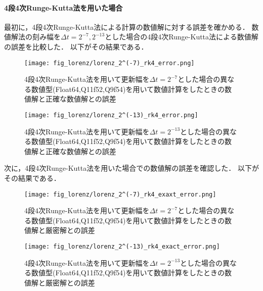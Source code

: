 \paragraph*{4段4次Runge-Kutta法を用いた場合}
最初に，4段4次Runge-Kutta法による計算の数値解に対する誤差を確かめる．
数値解法の刻み幅を$\Delta t = 2^{-7},2^{-13}$とした場合の4段4次Runge-Kutta法による数値解の誤差を比較した．
以下がその結果である．
\begin{figure}[H]
    \centering
    \begin{minipage}[b]{0.49\columnwidth}
        \centering
        \texttt{[image: fig\_lorenz/lorenz\_2^(-7)\_rk4\_error.png]}
        \caption{4段4次Runge-Kutta法を用いて更新幅を$\Delta t = 2^{-7}$とした場合の異なる数値型(Float64,Q11f52,Q9f54)を用いて数値計算をしたときの数値解と正確な数値解との誤差}
        \label{fig:lorenz_2^(-7)_rk4_error}
    \end{minipage}
    \begin{minipage}[b]{0.49\columnwidth}
        \centering
        \texttt{[image: fig\_lorenz/lorenz\_2^(-13)\_rk4\_error.png]}
        \caption{4段4次Runge-Kutta法を用いて更新幅を$\Delta t =  2^{-13}$とした場合の異なる数値型(Float64,Q11f52,Q9f54)を用いて数値計算をしたときの数値解と正確な数値解との誤差}
        \label{fig:lorenz_2^(-13)_rk4_error}
    \end{minipage}
\end{figure}
次に，4段4次Runge-Kutta法を用いた場合での数値解の誤差を確認した．
以下がその結果である．
\begin{figure}[H]
    \centering
    \begin{minipage}[b]{0.49\columnwidth}
        \centering
        \texttt{[image: fig\_lorenz/lorenz\_2^(-7)\_rk4\_exaxt\_error.png]}
        \caption{4段4次Runge-Kutta法を用いて更新幅を$\Delta t = 2^{-7}$とした場合の異なる数値型(Float64,Q11f52,Q9f54)を用いて数値計算をしたときの数値解と厳密解との誤差}
        \label{fig:lorenz_2^(-7)_rk4_exact_error}
    \end{minipage}
    \begin{minipage}[b]{0.49\columnwidth}
        \centering
        \texttt{[image: fig\_lorenz/lorenz\_2^(-13)\_rk4\_exact\_error.png]}
        \caption{4段4次Runge-Kutta法を用いて更新幅を$\Delta t =  2^{-13}$とした場合の異なる数値型(Float64,Q11f52,Q9f54)を用いて数値計算をしたときの数値解と厳密解との誤差}
        \label{fig:lorenz_2^(-13)_rk4_exact_error}
    \end{minipage}
\end{figure}

